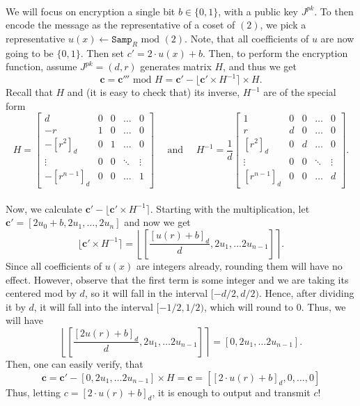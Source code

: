 \documentclass{article}
\theoremstyle{definition}
\theoremstyle{example}
\renewcommand{\mod}{\,\,\text{mod}\,\,}
\newcommand{\Samp}{\texttt{Samp}}
\renewcommand{\vec}[1]{\mathbf{#1}}
\begin{document}
\paragraph{} We will focus on encryption a single bit $b \in \{0, 1\}$, with a
public key $J^{pk}$. To then encode the message as the representative of a coset
of $(2)$, we pick a representative $u(x) \leftarrow \Samp_R \mod (2)$. Note, that all
coefficients of $u$ are now going to be $\{0, 1\}$. Then set $c' = 2\cdot u(x) + b$.
Then, to perform the encryption function, assume $J^{pk} = (d, r)$ generates
matrix $H$, and thus we get
\[
  \vec{c} = \vec{c}''' \mod H = \vec{c}' - \lfloor \vec{c}' \times H^{-1} \rceil
  \times H.
\]
Recall that $H$ and (it is easy to check that) its inverse, $H^{-1}$ are of the
special form
\[
  H = \begin{bmatrix}
    d & 0 & 0 &\hdots &0 \\
    -r & 1 & 0 &\hdots &0 \\
    -[r^2]_d & 0 & 1 & \hdots& 0 \\
    \vdots & 0 & 0 & \ddots & \vdots \\
    -[r^{n - 1}]_d & 0 & 0 & \hdots & 1
  \end{bmatrix}
  \quad\text{ and }\quad
  H^{-1} = \frac{1}{d}\begin{bmatrix}
    1 & 0 & 0 &\hdots &0 \\
    r & d & 0 &\hdots &0 \\
    [r^2]_d & 0 & d & \hdots& 0 \\
    \vdots & 0 & 0 & \ddots & \vdots \\
    [r^{n - 1}]_d & 0 & 0 & \hdots & d
  \end{bmatrix}.
\]
\paragraph{} Now, we calculate $\vec{c}' - \lfloor \vec{c}' \times H^{-1} \rceil$.
Starting with the multiplication, let $\vec{c}' = [2u_0 + b, 2u_1, \hdots,
2u_n]$ and now we get
\[
  \lfloor \vec{c}' \times H^{-1} \rceil = \left\lfloor\left[\frac{[u(r) + b]_d}d , 2u_1,
    \hdots 2u_{n-1}\right] \right\rceil.
\]
Since all coefficients of $u(x)$ are integers already, rounding them will have
no effect. However, observe that the first term is some integer and we are
taking its centered mod by $d$, so it will fall in the interval $[-d/2, d/2)$.
Hence, after dividing it by $d$, it will fall into the interval $[-1/2, 1/2)$,
which will round to $0$. Thus, we will have
\[
  \left\lfloor\left[\frac{[2u(r) + b]_d}d , 2u_1,\hdots 2u_{n-1}\right]
  \right\rceil = [ 0 , 2u_1,\hdots 2u_{n-1}].
\]
Then, one can easily verify, that  
\[
  \vec{c} = \vec{c}' - [ 0 , 2u_1,\hdots 2u_{n-1}] \times H = \vec{c} = [[2\cdot
  u(r) + b]_d, 0, \hdots, 0]
\]
Thus, letting $c = [2\cdot u(r) + b]_d$, it is enough to output and transmit $c$!
\end{document}
